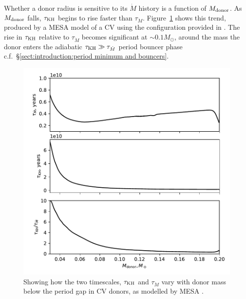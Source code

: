 Whether a donor radius is sensitive to its $\dot M$ history is a function of $M_{\rm donor}$. As $M_{\rm donor}$ falls, $\tau_{\rm KH}$ begins to rise faster than $\tau_{\dot M}$. Figure~\ref{fig:results:how does tauKH and tauMdot vary with donor mass} shows this trend, produced by a MESA model of a CV using the configuration provided in \citet{Paxton_2015}.
The rise in $\tau_{\rm KH}$ relative to $\tau_{\dot M}$ becomes significant at $\sim 0.1 M_\odot$, around the mass the donor enters the adiabatic $\tau_{\rm KH} \gg \tau_{\dot M}$ period bouncer phase c.f.~\S\ref{sect:introduction:period minimum and bouncers}.
\begin{figure}
    \centering
    \includegraphics[width=\textwidth]{figures/modelling/tau_both_vs_donor_mass_AML000.pdf}
    \caption{Showing how the two timescales, $\tau_{\rm KH}$ and $\tau_{\dot M}$ vary with donor mass below the period gap in CV donors, as modelled by MESA \citep{Paxton_2015,Pala2017a}.}
    \label{fig:results:how does tauKH and tauMdot vary with donor mass}
\end{figure}

